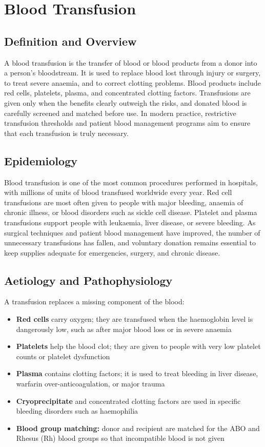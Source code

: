 \chapter{Blood Transfusion}

\section*{Definition and Overview}
A blood transfusion is the transfer of blood or blood products from a donor into a person's bloodstream. It is used to replace blood lost through injury or surgery, to treat severe anaemia, and to correct clotting problems. Blood products include red cells, platelets, plasma, and concentrated clotting factors. Transfusions are given only when the benefits clearly outweigh the risks, and donated blood is carefully screened and matched before use. In modern practice, restrictive transfusion thresholds and patient blood management programs aim to ensure that each transfusion is truly necessary.

\section*{Epidemiology}
Blood transfusion is one of the most common procedures performed in hospitals, with millions of units of blood transfused worldwide every year. Red cell transfusions are most often given to people with major bleeding, anaemia of chronic illness, or blood disorders such as sickle cell disease. Platelet and plasma transfusions support people with leukaemia, liver disease, or severe bleeding. As surgical techniques and patient blood management have improved, the number of unnecessary transfusions has fallen, and voluntary donation remains essential to keep supplies adequate for emergencies, surgery, and chronic disease.

\section*{Aetiology and Pathophysiology}
A transfusion replaces a missing component of the blood:

\begin{itemize}
    \item \textbf{Red cells} carry oxygen; they are transfused when the haemoglobin level is dangerously low, such as after major blood loss or in severe anaemia
    \item \textbf{Platelets} help the blood clot; they are given to people with very low platelet counts or platelet dysfunction
    \item \textbf{Plasma} contains clotting factors; it is used to treat bleeding in liver disease, warfarin over-anticoagulation, or major trauma
    \item \textbf{Cryoprecipitate} and concentrated clotting factors are used in specific bleeding disorders such as haemophilia
    \item \textbf{Blood group matching:} donor and recipient are matched for the ABO and Rhesus (Rh) blood groups so that incompatible blood is not given
\end{itemize}

